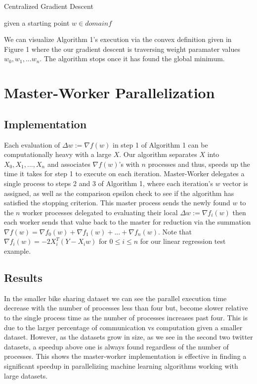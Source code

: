 \documentclass{article}
\theoremstyle{definition}
\begin{document}
\begin{algorithm}[!ht]
    \SetAlgoLined
    \caption{Centralized Gradient Descent}
    given a starting point $w \in domain f$\;
\end{algorithm}{

We can visualize Algorithm 1's execution via the convex definition given in Figure 1 where the our gradient descent is traversing weight paramater values $w_0, w_1, ... w_n$. The algorithm stops once it has found the global minimum.

\section{Master-Worker Parallelization}
\subsection{Implementation}
Each evaluation of $\Delta w := \nabla f(w)$ in step 1 of Algorithm 1 can be computationally heavy with a large $X$. Our algorithm separates $X$ into $X_0, X_1, ... ,X_n$ and associates $\nabla f(w)$'s with $n$ processes and thus, speeds up the time it takes for step 1 to execute on each iteration. Master-Worker delegates a single process to steps 2 and 3 of Algorithm 1, where each iteration's $w$ vector is assigned, as well as the comparison epsilon check to see if the algorithm has satisfied the stopping criterion. This master process sends the newly found $w$ to the $n$ worker processes delegated to evaluating their local $\Delta w := \nabla f_i(w)$ then each worker sends that value back to the master for reduction via the summation $\nabla f(w) = \nabla f_0(w) + \nabla f_1(w) + ... + \nabla f_n(w)$. Note that $\nabla f_i(w) = -2X_i^T(Y - X_iw)$ for $0 \leq i \leq n$ for our linear regression test example.

\subsection{Results}
In the smaller bike sharing  dataset we can see the parallel execution time decrease with the number of processes less than four but, become slower relative to the single process time as the number of processes increases past four. This is due to the larger percentage of communication vs computation given a smaller dataset. However, as the datasets grow in size, as we see in the second two twitter datasets, a speedup above one is always found regardless of the number of processes. This shows the master-worker implementation is effective in finding a significant speedup in parallelizing machine learning algorithms working with large datasets.
\clearpage
}
\end{document}
